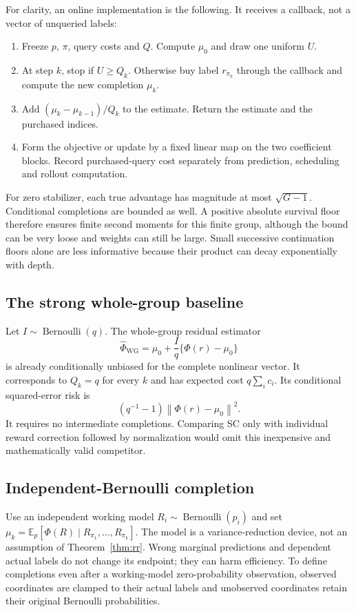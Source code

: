 \documentclass[11pt]{article}
\newcommand{\E}{\mathbb E}
\newcommand{\norm}[1]{\left\lVert#1\right\rVert}
\begin{document}
For clarity, an online implementation is the following. It receives a callback, not a vector of unqueried labels:
\begin{enumerate}
\item Freeze $p$, $\pi$, query costs and $Q$. Compute $\mu_0$ and draw one uniform $U$.
\item At step $k$, stop if $U\ge Q_k$. Otherwise buy label $r_{\pi_k}$ through the callback and compute the new completion $\mu_k$.
\item Add $(\mu_k-\mu_{k-1})/Q_k$ to the estimate. Return the estimate and the purchased indices.
\item Form the objective or update by a fixed linear map on the two coefficient blocks. Record purchased-query cost separately from prediction, scheduling and rollout computation.
\end{enumerate}
For zero stabilizer, each true advantage has magnitude at most $\sqrt{G-1}$. Conditional completions are bounded as well. A positive absolute survival floor therefore ensures finite second moments for this finite group, although the bound can be very loose and weights can still be large. Small successive continuation floors alone are less informative because their product can decay exponentially with depth.

\subsection{The strong whole-group baseline}
Let $I\sim\operatorname{Bernoulli}(q)$. The whole-group residual estimator
\begin{equation}\label{eq:whole}
 \widehat\Phi_{\mathrm{WG}}=\mu_0+\frac Iq\{\Phi(r)-\mu_0\}
\end{equation}
is already conditionally unbiased for the complete nonlinear vector. It corresponds to $Q_k=q$ for every $k$ and has expected cost $q\sum_i c_i$. Its conditional squared-error risk is
\[
 (q^{-1}-1)\norm{\Phi(r)-\mu_0}^2.
\]
It requires no intermediate completions. Comparing SC only with individual reward correction followed by normalization would omit this inexpensive and mathematically valid competitor.

\subsection{Independent-Bernoulli completion}\label{sec:completion}
Use an independent working model $R_i\sim\operatorname{Bernoulli}(p_i)$ and set $\mu_k=\E_p[\Phi(R)\mid R_{\pi_1},\ldots,R_{\pi_k}]$. The model is a variance-reduction device, not an assumption of Theorem~\ref{thm:rr}. Wrong marginal predictions and dependent actual labels do not change its endpoint; they can harm efficiency. To define completions even after a working-model zero-probability observation, observed coordinates are clamped to their actual labels and unobserved coordinates retain their original Bernoulli probabilities.
\end{document}
